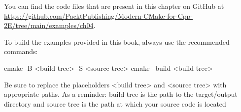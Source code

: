 You can find the code files that are present in this chapter on GitHub at \url{https://github.com/PacktPublishing/Modern-CMake-for-Cpp-2E/tree/main/examples/ch04}.

To build the examples provided in this book, always use the recommended commands:

\begin{shell}
cmake -B <build tree> -S <source tree>
cmake --build <build tree>
\end{shell}

Be sure to replace the placeholders <build tree> and <source tree> with appropriate paths. As a reminder: build tree is the path to the target/output directory and source tree is the path at which your source code is located










